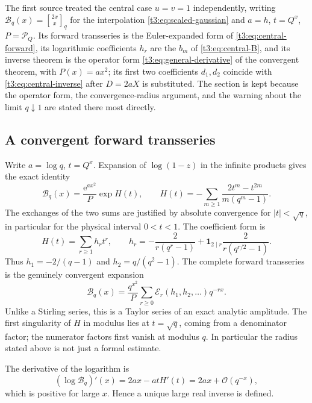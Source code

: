 \documentclass[11pt,openany]{book}
\numberwithin{equation}{chapter}
\theoremstyle{plain}
\theoremstyle{definition}
\theoremstyle{remark}
\newcommand{\ee}{\mathrm e}
\newcommand{\OO}{\mathcal O}\newcommand{\bigO}{\mathcal O}
\newcommand{\ExpC}{\mathcal E}\newcommand{\LogC}{\mathcal L}
\newcommand{\qbin}[3]{\genfrac{[}{]}{0pt}{}{#1}{#2}_{#3}}   %
\newcommand{\Pinf}{\mathcal P_Q}
\begin{document}
The first source treated the central case $u=v=1$ independently, writing
$\mathcal B_q(x)=\qbin{2x}{x}{q}$ for the interpolation
\cref{t3:eq:scaled-gaussian} and $a=h$, $t=Q^x$, $P=\Pinf$.  Its forward
transseries is the Euler-expanded form of \cref{t3:eq:central-forward}, its
logarithmic coefficients $h_r$ are the $b_m$ of \cref{t3:eq:central-B}, and
its inverse theorem is the operator form \cref{t3:eq:general-derivative} of
the convergent theorem, with $P(x)=ax^2$; its first two coefficients
$d_1,d_2$ coincide with \cref{t3:eq:central-inverse} after $D=2aX$ is
substituted.  The section is kept because the operator form, the
convergence-radius argument, and the warning about the limit $q\downarrow1$
are stated there most directly.

\subsection{A convergent forward transseries}
Write $a=\log q$, $t=Q^x$. Expansion of $\log(1-z)$ in the infinite products gives the exact identity
\begin{equation}
 \mathcal B_q(x)=\frac{\ee^{ax^2}}P\exp H(t),\qquad
 H(t)=-\sum_{m\ge1}\frac{2t^m-t^{2m}}{m(q^m-1)}.
 \label{t1:eq:qbinH}
\end{equation}
The exchanges of the two sums are justified by absolute convergence for $|t|<\sqrt q$, in particular for the physical interval $0<t<1$. The coefficient form is
\begin{equation}
 H(t)=\sum_{r\ge1}h_rt^r,\qquad
 h_r=-\frac2{r(q^r-1)}+
 \mathbf1_{2\mid r}\frac2{r(q^{r/2}-1)}.
 \label{t1:eq:qbinh}
\end{equation}
Thus $h_1=-2/(q-1)$ and $h_2=q/(q^2-1)$. The complete forward transseries is the genuinely convergent expansion
\begin{equation}
 \mathcal B_q(x)=\frac{q^{x^2}}P
 \sum_{r\ge0}\ExpC_r(h_1,h_2,\ldots)q^{-rx}.
 \label{t1:eq:qbinforward}
\end{equation}
Unlike a Stirling series, this is a Taylor series of an exact analytic amplitude. The first singularity of $H$ in modulus lies at $t=\sqrt q$, coming from a denominator factor; the numerator factors first vanish at modulus $q$. In particular the radius stated above is not just a formal estimate.

The derivative of the logarithm is
\[
 (\log\mathcal B_q)'(x)=2ax-atH'(t)=2ax+\OO(q^{-x}),
\]
which is positive for large $x$. Hence a unique large real inverse is defined.
\end{document}
